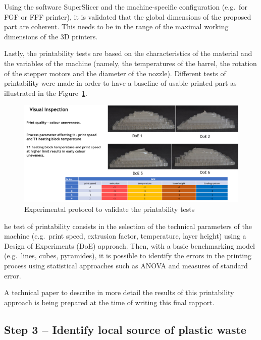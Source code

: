 \documentclass[
  11pt,
]{article}
\begin{document}
Using the software SuperSlicer and the machine-specific configuration
(e.g.~for FGF or FFF printer), it is validated that the global
dimensions of the proposed part are coherent. This needs to be in the
range of the maximal working dimensions of the 3D printers.

Lastly, the printability tests are based on the characteristics of the
material and the variables of the machine (namely, the temperatures of
the barrel, the rotation of the stepper motors and the diameter of the
nozzle). Different tests of printability were made in order to have a
baseline of usable printed part as illustrated in the
Figure~\ref{fig-printability}.

\begin{figure}[H]

{\centering \includegraphics[width=4.6875in,height=\textheight]{figures/Swapnil-Results-02.jpg}

}

\caption{\label{fig-printability}Experimental protocol to validate the
printability tests}

\end{figure}

he test of printability consists in the selection of the technical
parameters of the machine (e.g.~print speed, extrusion factor,
temperature, layer height) using a Design of Experiments (DoE) approach.
Then, with a basic benchmarking model (e.g.~lines, cubes, pyramides), it
is possible to identify the errors in the printing process using
statistical approaches such as ANOVA and measures of standard error.

A technical paper to describe in more detail the results of this
printability approach is being prepared at the time of writing this
final rapport.

\hypertarget{step-3-identify-local-source-of-plastic-waste}{%
\subsection{Step 3 -- Identify local source of plastic
waste}\label{step-3-identify-local-source-of-plastic-waste}}
\end{document}
